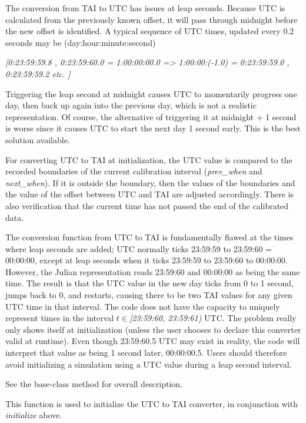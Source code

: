 {\begin{enumerate}
{\begin{enumerate}
The conversion from TAI to UTC has issues at leap seconds. 
Because UTC is calculated from the previously known offset, it will
pass through midnight before the new offset is identified.  A typical
sequence of UTC times, updated every 0.2 seconds may be
(day:hour:minute:second)  

{\itshape
[0:23:59:59.8 ,  0:23:59:60.0 = 1:00:00:00.0 ={\textgreater}
1:00:00:(-1.0) = 0:23:59:59.0 , 0:23:59:59.2 etc. ] }

Triggering the leap second at midnight causes UTC to momentarily progress one
day, then back up again into the
previous day, which is not a realistic representation.  Of course, the
alternative of triggering it at midnight + 1 second is worse since it
causes UTC to start the next day 1 second early.  This is the best
solution available.

For converting UTC to TAI at initialization, the UTC value is
compared to the recorded boundaries of the current calibration interval
(\textit{prev\_when} and \textit{next\_when}).  If it is outside the
boundary, then the values of the boundaries and the value of the offset
between UTC and TAI are adjusted accordingly.  There
is also verification that the current time has not passed the end of
the calibrated data.  

The conversion function from UTC to TAI is
fundamentally flawed at the times where leap seconds are added;
UTC normally ticks 23:59:59 to 23:59:60 = 00:00:00, except at
leap seconds when it ticks 23:59:59 to 23:59:60 to 00:00:00.  However,
the Julian representation reads 23:59:60 and 00:00:00 as being the same
time.  The result is that the UTC value in the new day ticks
from 0 to 1 second, jumps back to 0, and restarts, causing there to be
two TAI values for any given UTC time in that
interval.  The code does not have the capacity to uniquely represent times 
in the interval  $t\in $\textit{[23:59:60, 23:59:61)} UTC. 
The problem really only shows itself at initialization (unless the user
chooses to declare this converter valid at runtime).  
Even though 23:59:60.5  UTC may exist in reality,
the code will interpret that value as being 1 second later, 00:00:00.5.
 Users should therefore avoid initializing a simulation using a
UTC value during a leap second interval.


See the base-class  method 
for overall description.

\label{ref:initializeleapseconds}
This function is used to initialize the UTC to TAI converter, in
conjunction with \textit{initialize} above.


\end{enumerate}}
\end{enumerate}}
